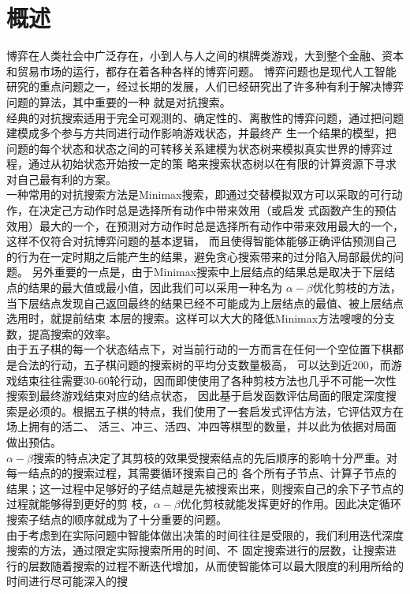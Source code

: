 \documentclass{acm_proc_article-sp}
\begin{document}
\section{\textbf{概述}}
博弈在人类社会中广泛存在，小到人与人之间的棋牌类游戏，大到整个金融、资本和贸易市场的运行，都存在着各种各样的博弈问题。
博弈问题也是现代人工智能研究的重点问题之一，经过长期的发展，人们已经研究出了许多种有利于解决博弈问题的算法，其中重要的一种
就是对抗搜索。\\
经典的对抗搜索适用于完全可观测的、确定性的、离散性的博弈问题，通过把问题建模成多个参与方共同进行动作影响游戏状态，并最终产
生一个结果的模型，把问题的每个状态和状态之间的可转移关系建模为状态树来模拟真实世界的博弈过程，通过从初始状态开始按一定的策
略来搜索状态树以在有限的计算资源下寻求对自己最有利的方案。\\
一种常用的对抗搜索方法是Minimax搜索，即通过交替模拟双方可以采取的可行动作，在决定己方动作时总是选择所有动作中带来效用（或启发
式函数产生的预估效用）最大的一个，在预测对方动作时总是选择所有动作中带来效用最大的一个，这样不仅符合对抗博弈问题的基本逻辑，
而且使得智能体能够正确评估预测自己的行为在一定时期之后能产生的结果，避免贪心搜索带来的过分陷入局部最优的问题。
另外重要的一点是，由于Minimax搜索中上层结点的结果总是取决于下层结点的结果的最大值或最小值，因此我们可以采用一种名为
$\alpha-\beta$优化剪枝的方法，当下层结点发现自己返回最终的结果已经不可能成为上层结点的最值、被上层结点选用时，就提前结束
本层的搜索。这样可以大大的降低Minimax方法嗖嗖的分支数，提高搜索的效率。\\
由于五子棋的每一个状态结点下，对当前行动的一方而言在任何一个空位置下棋都是合法的行动，五子棋问题的搜索树的平均分支数量极高，
可以达到近200，而游戏结束往往需要30-60轮行动，因而即使使用了各种剪枝方法也几乎不可能一次性搜索到最终游戏结束对应的结点状态，
因此基于启发函数评估局面的限定深度搜索是必须的。根据五子棋的特点，我们使用了一套启发式评估方法，它评估双方在场上拥有的活二、
活三、冲三、活四、冲四等棋型的数量，并以此为依据对局面做出预估。\\
$\alpha-\beta$搜索的特点决定了其剪枝的效果受搜索结点的先后顺序的影响十分严重。对每一结点的的搜索过程，其需要循环搜索自己的
各个所有子节点、计算子节点的结果；这一过程中足够好的子结点越是先被搜索出来，则搜索自己的余下子节点的过程就能够得到更好的剪
枝，$\alpha-\beta$优化剪枝就能发挥更好的作用。因此决定循环搜索子结点的顺序就成为了十分重要的问题。\\
由于考虑到在实际问题中智能体做出决策的时间往往是受限的，我们利用迭代深度搜索的方法，通过限定实际搜索所用的时间、不
固定搜索进行的层数，让搜索进行的层数随着搜索的过程不断迭代增加，从而使智能体可以最大限度的利用所给的时间进行尽可能深入的搜
\end{document}
